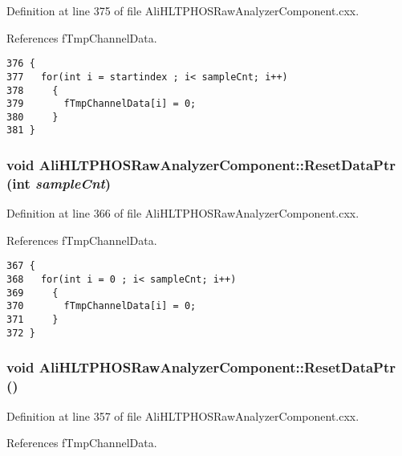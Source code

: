Definition at line 375 of file Ali\-HLTPHOSRaw\-Analyzer\-Component.cxx.

References f\-Tmp\-Channel\-Data.

\footnotesize\begin{verbatim}376 {
377   for(int i = startindex ; i< sampleCnt; i++)
378     {
379       fTmpChannelData[i] = 0;
380     }
381 }
\end{verbatim}\normalsize 


\subsubsection{\setlength{\rightskip}{0pt plus 5cm}void Ali\-HLTPHOSRaw\-Analyzer\-Component::Reset\-Data\-Ptr (int {\em sample\-Cnt})\hspace{0.3cm}{\tt  [private]}}\label{classAliHLTPHOSRawAnalyzerComponent_AliHLTPHOSRawAnalyzerComponentd2}




Definition at line 366 of file Ali\-HLTPHOSRaw\-Analyzer\-Component.cxx.

References f\-Tmp\-Channel\-Data.

\footnotesize\begin{verbatim}367 {
368   for(int i = 0 ; i< sampleCnt; i++)
369     {
370       fTmpChannelData[i] = 0;
371     }
372 }
\end{verbatim}\normalsize 


\subsubsection{\setlength{\rightskip}{0pt plus 5cm}void Ali\-HLTPHOSRaw\-Analyzer\-Component::Reset\-Data\-Ptr ()\hspace{0.3cm}{\tt  [private]}}\label{classAliHLTPHOSRawAnalyzerComponent_AliHLTPHOSRawAnalyzerComponentd1}




Definition at line 357 of file Ali\-HLTPHOSRaw\-Analyzer\-Component.cxx.

References f\-Tmp\-Channel\-Data.


